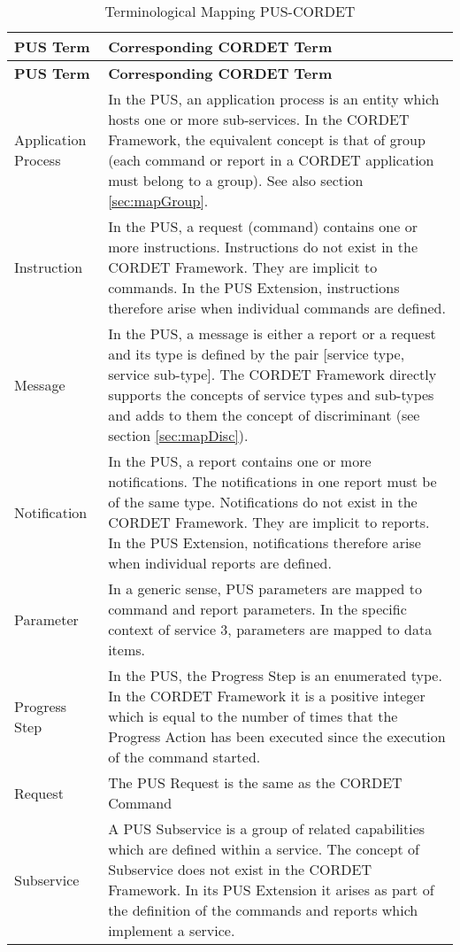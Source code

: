 \documentclass{pnp_article}
\begin{document}
\newpage
\begin{longtable}{|l|>{\raggedright\arraybackslash}p{10cm}|}
\caption{Terminological Mapping PUS-CORDET}\label{tab:termPusCr} \\
\hline
\rowcolor{light-gray}
\textbf{PUS Term} & \textbf{Corresponding CORDET Term} \\
\hline\hline
\endfirsthead
\rowcolor{light-gray}
\textbf{PUS Term} & \textbf{Corresponding CORDET Term} \\
\hline\hline
\endhead
Application Process & In the PUS, an application process is an entity which hosts one or more sub-services. In the CORDET Framework, the equivalent concept is that of group (each command or report in a CORDET application must belong to a group). See also section \ref{sec:mapGroup}. \\  
\hline
Instruction & In the PUS, a request (command) contains one or more instructions. Instructions do not exist in the CORDET Framework. They are implicit to commands. In the PUS Extension, instructions therefore arise when individual commands are defined. \\
\hline
Message & In the PUS, a message is either a report or a request and its type is defined by the pair [service type, service sub-type]. The CORDET Framework directly supports the concepts of service types and sub-types and adds to them the concept of discriminant (see section \ref{sec:mapDisc}). \\
\hline
Notification & In the PUS, a report contains one or more notifications. The notifications in one report must be of the same type. Notifications do not exist in the CORDET Framework. They are implicit to reports. In the PUS Extension, notifications therefore arise when individual reports are defined. \\
\hline
Parameter & In a generic sense, PUS parameters are mapped to command and report parameters. In the specific context of service 3, parameters are mapped to data items. \\
\hline
Progress Step & In the PUS, the Progress Step is an enumerated type. In the CORDET Framework it is a positive integer which is equal to the number of times that the Progress Action has been executed since the execution of the command started. \\
\hline
Request & The PUS Request is the same as the CORDET Command \\
\hline
Subservice & A PUS Subservice is a group of related capabilities which are defined within a service. The concept of Subservice does not exist in the CORDET Framework. In its PUS Extension it arises as part of the definition of the commands and reports which implement a service. \\

\end{longtable}
\end{document}
